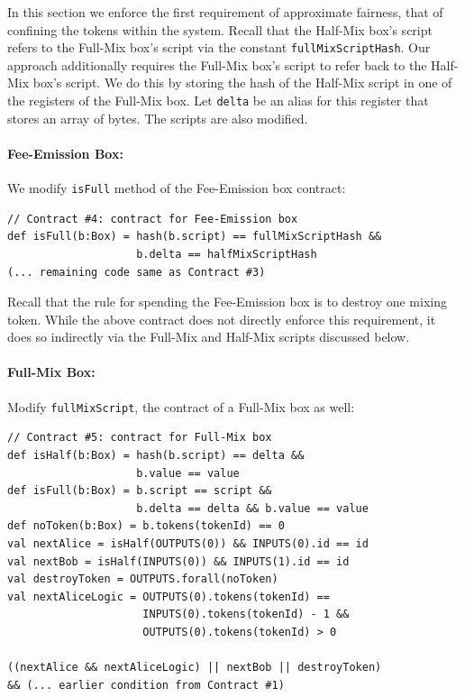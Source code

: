 \documentclass[runningheads]{llncs}
\begin{document}
In this section we enforce the first requirement of approximate fairness, that of confining the tokens within the system. 
Recall that the Half-Mix box's script refers to the Full-Mix box's script via the constant \texttt{fullMixScriptHash}. Our approach additionally requires the Full-Mix box's script to refer back to the Half-Mix box's script. We do this by storing the hash of the Half-Mix script in one of the registers of the Full-Mix box. Let \texttt{delta} be an alias for this register that stores an array of bytes. The scripts are also modified.

\paragraph{Fee-Emission Box:}
We modify \texttt{isFull} method of the Fee-Emission box contract:

{\small
\begin{Verbatim}[frame=single]
// Contract #4: contract for Fee-Emission box
def isFull(b:Box) = hash(b.script) == fullMixScriptHash && 
                    b.delta == halfMixScriptHash
(... remaining code same as Contract #3)                    
\end{Verbatim}
}

Recall that the rule for spending the Fee-Emission box is to destroy one mixing token. While the above contract does not directly enforce this requirement, it does so indirectly via the Full-Mix and Half-Mix scripts discussed below.

\paragraph{Full-Mix Box:}

Modify \texttt{fullMixScript}, the contract of a Full-Mix box as well:

{\small
\begin{Verbatim}[frame=single]
// Contract #5: contract for Full-Mix box
def isHalf(b:Box) = hash(b.script) == delta && 
                    b.value == value
def isFull(b:Box) = b.script == script &&
                    b.delta == delta && b.value == value
def noToken(b:Box) = b.tokens(tokenId) == 0
val nextAlice = isHalf(OUTPUTS(0)) && INPUTS(0).id == id
val nextBob = isHalf(INPUTS(0)) && INPUTS(1).id == id
val destroyToken = OUTPUTS.forall(noToken)
val nextAliceLogic = OUTPUTS(0).tokens(tokenId) == 
                     INPUTS(0).tokens(tokenId) - 1 && 
                     OUTPUTS(0).tokens(tokenId) > 0

((nextAlice && nextAliceLogic) || nextBob || destroyToken) 
&& (... earlier condition from Contract #1)
\end{Verbatim}
}
\end{document}
